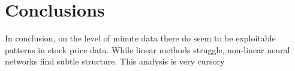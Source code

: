 \documentclass{article}
\begin{document}
\section{Conclusions}

In conclusion, on the level of minute data there do seem to be exploitable patterns
in stock price data. While linear methods struggle, non-linear neural networks
find subtle structure. This analysis is very cursory 

{}


\nocite{*}
\end{document}
